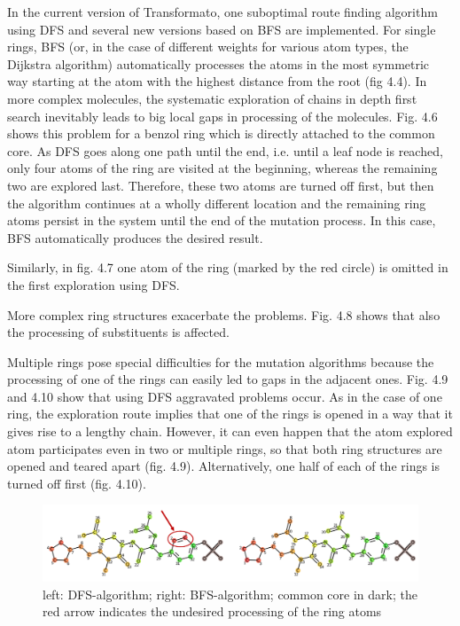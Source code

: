 In the current version of Transformato, one suboptimal route finding algorithm using DFS and several new versions based on BFS are implemented.
For single rings, BFS (or, in the case of different weights for various atom types, the Dijkstra algorithm) automatically processes the atoms in the most symmetric way starting at the atom with the highest distance from the root (fig 4.4).
In more complex molecules, the systematic exploration of chains in
depth first search inevitably leads to big local gaps in processing
of the molecules. Fig. 4.6 shows this problem for a benzol ring which
is directly attached to the common core. As DFS goes along one path
until the end, i.e. until a leaf node is reached, only four atoms of the
ring are visited at the beginning, whereas the remaining two are explored
last. Therefore, these two atoms are turned off first, but then the
algorithm continues at a wholly different location and the remaining
ring atoms persist in the system until the end of the mutation process.
In this case, BFS automatically produces the desired result. 

Similarly, in fig. 4.7 one atom of the ring (marked by the red circle)
is omitted in the first exploration using DFS.

More complex ring structures exacerbate the problems. Fig. 4.8 shows that also the processing of substituents is affected.

Multiple rings pose special difficulties for the mutation algorithms because
the processing of one of the rings can easily led to gaps in the adjacent
ones. Fig. 4.9 and 4.10 show that using DFS aggravated problems occur.
As in the case of one ring, the exploration route implies that one
of the rings is opened in a way that it gives rise to a lengthy chain.
However, it can even happen that the atom explored atom participates
even in two or multiple rings, so that both ring structures are opened
and teared apart (fig. 4.9). Alternatively, one half of each of the
rings is turned off first (fig. 4.10). 

\begin{figure}
\includegraphics[scale=1.5]{simple_ring_exampledfs2}\caption{left: DFS-algorithm; right: BFS-algorithm; common core in dark; the
red arrow indicates the undesired processing of the ring atoms}

\end{figure}

